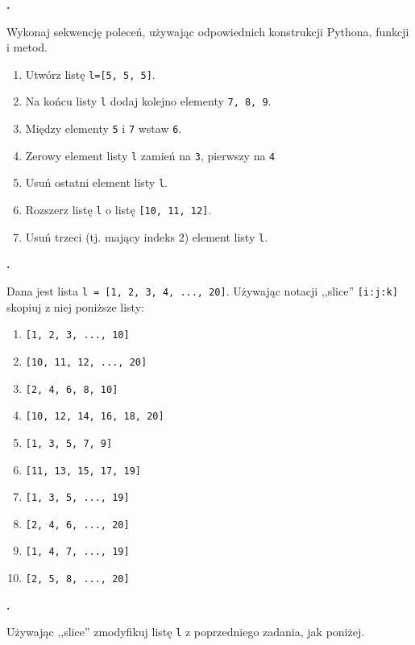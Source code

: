 \documentclass[a4paper]{article}
\begin{document}
\textbf{.}\addtocounter{zadanie}{1} Wykonaj sekwencję poleceń, używając odpowiednich konstrukcji Pythona, funkcji i metod.

\begin{enumerate}[label=\arabic*.]
    \item Utwórz listę \verb|l=[5, 5, 5]|.
    \item Na końcu listy \verb|l| dodaj kolejno elementy \verb|7, 8, 9|.
    \item Między elementy \verb|5| i \verb|7| wstaw \verb|6|.
    \item Zerowy element listy \verb|l| zamień na \verb|3|, pierwszy na \verb|4|
    \item Usuń ostatni element listy \verb|l|.
    \item Rozszerz listę \verb|l| o listę \verb|[10, 11, 12]|.
    \item Usuń trzeci (tj. mający indeks 2) element listy \verb|l|.
\end{enumerate}


\textbf{.}\addtocounter{zadanie}{1} Dana jest lista \verb|l = [1, 2, 3, 4, ..., 20]|. Używając notacji ,,slice'' \verb|[i:j:k]| skopiuj z niej poniższe listy:

\begin{multicols}{2}
\begin{enumerate}[label=\arabic*.]
    \item \verb|[1, 2, 3, ..., 10]|
    \item \verb|[10, 11, 12, ..., 20]|
    \item \verb|[2, 4, 6, 8, 10]|
    \item \verb|[10, 12, 14, 16, 18, 20]|
    \item \verb|[1, 3, 5, 7, 9]|
    \item \verb|[11, 13, 15, 17, 19]|
    \item \verb|[1, 3, 5, ..., 19]|
    \item \verb|[2, 4, 6, ..., 20]|
    \item \verb|[1, 4, 7, ..., 19]|
    \item \verb|[2, 5, 8, ..., 20]|
\end{enumerate}

\end{multicols}


\textbf{.}\addtocounter{zadanie}{1} Używając ,,slice'' zmodyfikuj listę \verb|l| z poprzedniego zadania, jak poniżej.
\end{document}
